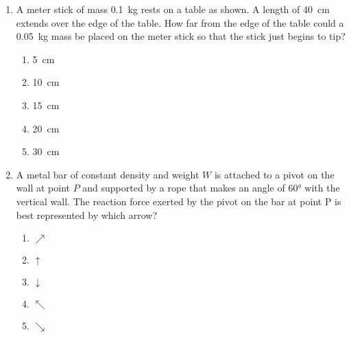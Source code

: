 \documentclass{../../../oss-apphys}
\begin{document}
\genheader


\genmultidirections

\gengravity

\raggedcolumns
\begin{multicols*}{2}
  \begin{enumerate}[leftmargin=18pt]

  \item A meter stick of mass \SI{.1}{\kilo\gram} rests on a table as shown. A
    length of \SI{40}{\centi\metre} extends over the edge of the table. How far
    from the edge of the table could a \SI{.05}{\kilo\gram} mass be placed on
    the meter stick so that the stick just begins to tip?
    \begin{center}
    \end{center}
    \begin{enumerate}[nosep,leftmargin=18pt,label=(\Alph*)]
    \item\SI{5}{\centi\metre}
    \item\SI{10}{\centi\metre}
    \item\SI{15}{\centi\metre}
    \item\SI{20}{\centi\metre}
    \item\SI{30}{\centi\metre}
    \end{enumerate}
    
  \item A metal bar of constant density and weight $W$ is attached to a pivot on
    the wall at point $P$ and supported by a rope that makes an angle of
    \ang{60} with the vertical wall. The reaction force exerted by the pivot on
    the bar at point P is best represented by which arrow?
    \begin{center}
    \end{center}
    \begin{enumerate}[itemsep=4.5pt,topsep=0pt,leftmargin=18pt,label=(\Alph*)]
    \item{\Large $\nearrow$}
    \item{\Large $\uparrow$}
    \item{\Large $\downarrow$}
    \item{\Large $\nwarrow$}
    \item{\Large $\searrow$}
    \end{enumerate}
    \columnbreak


\end{enumerate}
\end{multicols*}
\end{document}
